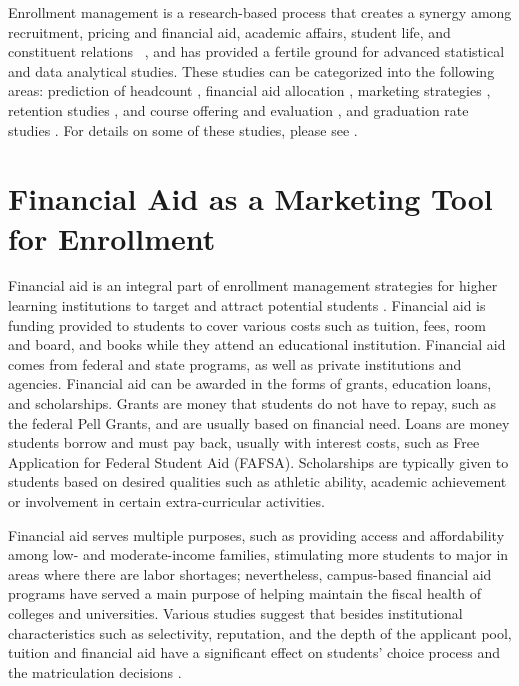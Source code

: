 \documentclass[12pt,english]{report}
\begin{document}
Enrollment management is a research-based process that creates a synergy among
recruitment, pricing and financial aid, academic affairs, student life, and
constituent relations ~\citep{huddlestonenrollment2000}, and has provided a
fertile ground for advanced statistical and data analytical studies. These
studies can be categorized into the following areas: prediction of headcount
\citep{Chang2006}, financial aid allocation \citep{leedsthe2014, Dynarski2003},
marketing strategies \citep{pandeyAdvertise}, retention studies
\citep{grossinstitutional2015, Dynarski2003, Herzog2006}, and course offering
and evaluation \citep{SurjeetClassEnroll,luan2006courseoffer}, and graduation
rate studies \citep{Bailey2006}.  For details on some of these studies, please
see \citep{Luan2006}.

\section{Financial Aid as a Marketing Tool for Enrollment}
Financial aid is an integral part of enrollment management strategies for
higher learning institutions to target and attract potential students
\citep{Dynarski2013}.  Financial aid is funding provided to students to cover
various costs such as tuition, fees, room and board, and books while they
attend an educational institution. Financial aid comes from federal and state
programs, as well as private institutions and agencies.  Financial aid can be
awarded in the forms of grants, education loans, and scholarships.  Grants are
money that students do not have to repay, such as the federal Pell Grants, and
are usually based on financial need.  Loans are money students borrow and must
pay back, usually with interest costs, such as Free Application for Federal
Student Aid (FAFSA). Scholarships are typically given to students based on
desired qualities such as athletic ability, academic achievement or involvement
in certain extra-curricular activities.

Financial aid serves multiple purposes, such as providing access and
affordability among low- and moderate-income families, stimulating more
students to major in areas where there are labor shortages; nevertheless,
campus-based financial aid programs have served a main purpose of helping
maintain the fiscal health of colleges and universities. Various studies
suggest that besides institutional characteristics such as selectivity,
reputation, and the depth of the applicant pool, tuition and financial aid have
a significant effect on students' choice process and the matriculation
decisions \citep{Fulleri2014}.
\end{document}
